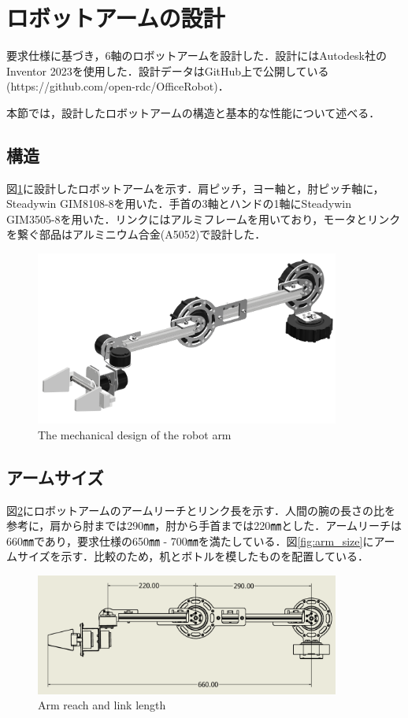 
\section{ロボットアームの設計}
要求仕様に基づき，6軸のロボットアームを設計した．設計にはAutodesk社のInventor 2023を使用した．設計データはGitHub上で公開している(https://github.com/open-rdc/OfficeRobot)．

本節では，設計したロボットアームの構造と基本的な性能について述べる．
\subsection{構造}
図\ref{fig:arm_design}に設計したロボットアームを示す．肩ピッチ，ヨー軸と，肘ピッチ軸に，Steadywin GIM8108-8を用いた．手首の3軸とハンドの1軸にSteadywin GIM3505-8を用いた．リンクにはアルミフレームを用いており，モータとリンクを繋ぐ部品はアルミニウム合金(A5052)で設計した．
\begin{figure}
  \centering
  \includegraphics[width=10cm]{images/design/arm_design.png}
  \caption{The mechanical design of the robot arm}
  \label{fig:arm_design}
\end{figure}
\subsection{アームサイズ}
図\ref{fig:link_length}にロボットアームのアームリーチとリンク長を示す．人間の腕の長さの比\cite{humanarm:online}を参考に，肩から肘までは290㎜，肘から手首までは220㎜とした．アームリーチは660㎜であり，要求仕様の650㎜ - 700㎜を満たしている．図\ref{fig:arm_size}にアームサイズを示す．比較のため，机とボトルを模したものを配置している．

\begin{figure}[htbp]
  \centering
  \includegraphics[width=10cm]{images/design/link_length.png}
  \caption{Arm reach and link length}
  \label{fig:link_length}
\end{figure}

